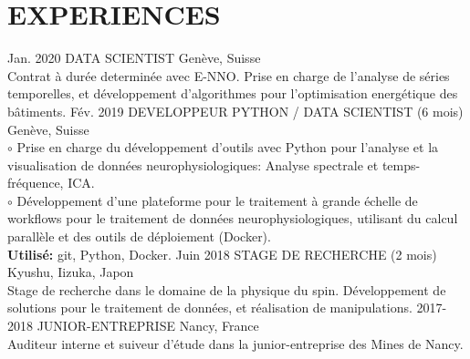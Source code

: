 \documentclass[]{cv-style}
\begin{document}
\section{EXPERIENCES}
\begin{entrylist}
%
\entry
{Jan. 2020}
{DATA SCIENTIST}
{Genève, Suisse}
{\\
    Contrat à durée determinée avec E-NNO. Prise en charge de l'analyse
    de séries temporelles, et développement d'algorithmes pour l'optimisation
    energétique des bâtiments.
\vspace{0.2cm}
}
%
\entry
{Fév. 2019}
{DEVELOPPEUR PYTHON / DATA SCIENTIST (6 mois)}
{Genève, Suisse}
{\\
    $\circ$ Prise en charge du développement d'outils avec Python pour 
    l'analyse et la visualisation de données neurophysiologiques: Analyse 
    spectrale et temps-fréquence, ICA.\\
    $\circ$ Développement d'une plateforme pour le traitement à grande échelle 
    de workflows pour le traitement de données neurophysiologiques, utilisant 
    du calcul parallèle et des outils de déploiement (Docker). \\
\textbf{Utilisé:} git, Python, Docker.
\vspace{0.2cm}
}
\entry
{Juin 2018}
{STAGE DE RECHERCHE (2 mois)}
{Kyushu, Iizuka, Japon}
{\\
    Stage de recherche dans le domaine de la physique du spin. Développement 
    de solutions pour le traitement de données, et réalisation de 
    manipulations. 
\vspace{0.2cm}
}
\entry
{2017-2018}
{JUNIOR-ENTREPRISE}
{Nancy, France}
{\\
    Auditeur interne et suiveur d'étude dans la junior-entreprise des Mines 
    de Nancy.
\vspace{0.2cm}
}
%
\end{entrylist}
\newpage
\hphantom\\
%
\end{document}

